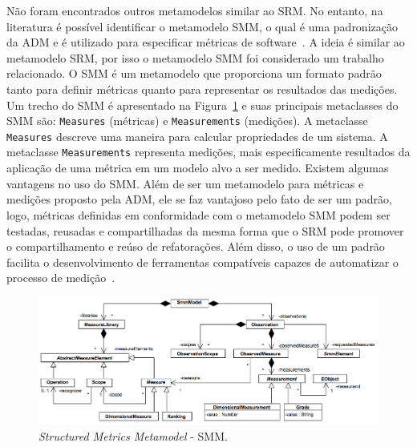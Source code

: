 Não foram encontrados outros metamodelos similar ao SRM. No entanto, na literatura é possível identificar o metamodelo SMM, o qual é uma padronização da ADM e é utilizado para especificar métricas de software~\cite{ADM:SMM}. A ideia é similar ao metamodelo SRM, por isso o metamodelo SMM foi considerado um trabalho relacionado. O SMM é um metamodelo que proporciona um formato padrão tanto para definir métricas quanto para representar os resultados das medições. Um trecho do SMM é apresentado na Figura~\ref{fig:SMM_metamodel_related} e suas principais metaclasses do SMM são: \texttt{Measures} (métricas) e \texttt{Measurements} (medições). A metaclasse \texttt{Measures} descreve uma maneira para calcular propriedades de um sistema. A metaclasse \texttt{Measurements} representa medições, mais especificamente resultados da aplicação de uma métrica em um modelo alvo a ser medido. Existem algumas vantagens no uso do SMM. Além de ser um metamodelo para métricas e medições proposto pela ADM, ele se faz vantajoso pelo fato de ser um padrão, logo, métricas definidas em conformidade com o metamodelo SMM podem ser testadas, reusadas e compartilhadas da mesma forma que o SRM pode promover o compartilhamento e reúso de refatorações. Além disso, o uso de um padrão facilita o desenvolvimento de ferramentas compatíveis capazes de automatizar o processo de medição~\cite{ADM:SMM}.

\begin{figure}[h]
	\centering
	\caption{\textit{Structured Metrics Metamodel} - SMM.}
	\label{fig:SMM_metamodel_related}
	\includegraphics[scale=0.45]{images/SMM_metamodelo_related}
\end{figure}


